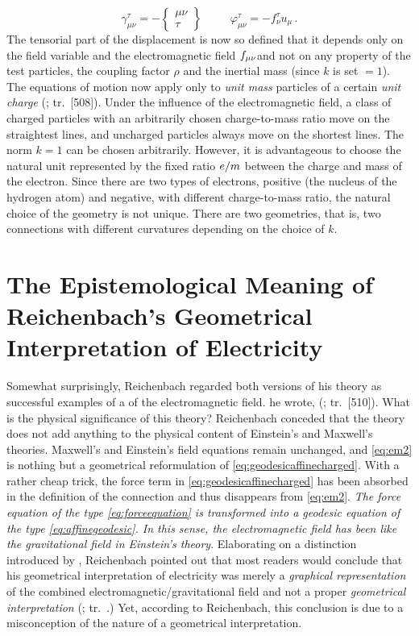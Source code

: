 \documentclass[submitted]{article}
\newcommand{\faradaymn}{\ensuremath{f\mn}}
\newcommand{\ctmr}{charge-to-mass ratio\xspace}
\newcommand{\ctmrf}{\ensuremath{\hfrac{e}{m}}\xspace}
\renewcommand{\rzlp}[2]{(\cite[#1]{Reichenbach1928}; tr.\ #2)\xspace}
\renewcommand{\rzlap}[2]{(\cite[#1]{Reichenbach1928}; tr.\ [#2])\xspace}
\begin{document}
\begin{equation}
\label{eq:dsd2}
\gamma^\tau_{\mu\nu}=-\begin{Bmatrix} \mu\nu \\ \tau \end{Bmatrix} \;\;\;\;\;\;\;\;\; \varphi_{\mu \nu}^{\tau}=- f_\nu^{\tau} u_{\mu}\,.
\end{equation}
%
The tensorial part of the displacement is now so defined that it depends only on the field variable and the electromagnetic field \faradaymn and not on any property of the test particles, \ie the coupling factor $\rho$ and the inertial mass (since $k$ is set $=1$). The equations of motion now apply only to \emph{unit mass} particles of a certain \emph{unit charge} \rzlap{363\f}{508\ff}. Under the influence of the electromagnetic field, a class of charged particles with an arbitrarily chosen \ctmr move on the straightest lines, and uncharged particles always move on the shortest lines. The norm $k=1$ can be chosen arbitrarily. However, it is advantageous to choose the natural unit represented by the fixed ratio \ctmrf between the charge and mass of the electron. Since there are two types of electrons, positive (the nucleus of the hydrogen atom) and negative, with different \ctmr, the natural choice of the geometry is not unique. There are two  geometries, that is, two connections \Gtmn with different curvatures depending on the choice of $k$.
 
\section{The Epistemological Meaning of Reichenbach's Geometrical Interpretation of Electricity}
%
Somewhat surprisingly, Reichenbach regarded both versions of his theory as successful examples of a  of the electromagnetic field.  he wrote,  \rzlap{365}{510}. What is the physical significance of this theory? Reichenbach conceded that the theory does not add anything to the physical content of Einstein's and Maxwell's theories. Maxwell's and Einstein's field equations remain unchanged, and \cref{eq:em2} is nothing but a geometrical reformulation of \cref{eq:geodesicaffinecharged}. With a rather cheap trick, the force term in \cref{eq:geodesicaffinecharged} has been absorbed in the definition of the connection and thus disappears from \cref{eq:em2}. \emph{The force equation of the type \cref{eq:forceequation} is transformed into a geodesic equation of the type \cref{eq:affinegeodesic}. In this sense, the electromagnetic field has been  like the gravitational field in Einstein's theory}. Elaborating on a distinction introduced by \citet{Eddington1925a}, Reichenbach pointed out that most readers would conclude that his geometrical interpretation of electricity was merely a \emph{graphical representation} of the combined electromagnetic/gravitational field and not a proper \emph{geometrical interpretation} \rzlp{\S15}. Yet, according to Reichenbach, this conclusion is due to a misconception of the nature of a geometrical interpretation. 
\end{document}
